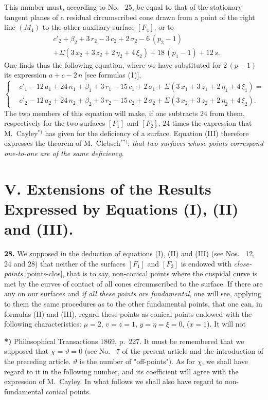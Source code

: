 \documentclass{article}
\begin{document}
This number must, according to No.~ 25, be equal to that of the stationary tangent planes of a residual circumscribed cone drawn from a point of the right line $(M_4)$ to the other auxiliary surface $[F_4]$, or to
\[
\begin{aligned}
& c'_2 + \beta_2 + 3\,r_2 - 3\,c_2 + 2\,\sigma_2 - 6\,(p_2 - 1) \\
& + \Sigma(3\,x_2 + 3\,z_2 + 2\,\eta_2 + 4\,\xi_2) + 18\,(p_1 - 1) + 12\,s.
\end{aligned}
\]
One finds thus the following equation, where we have substituted for $2\,(p - 1)$ its expression $a + c - 2\,n$ [see formulas (1)],
\[
\tag{III}
\left\{
\begin{aligned}
& c'_1 - 12\,a_1 + 24\,n_1 + \beta_1 + 3\,r_1 - 15\,c_1 + 2\,\sigma_1 + \Sigma(3\,x_1 + 3\,z_1 + 2\,\eta_1 + 4\,\xi_1) = \\
& c'_2 - 12\,a_2 + 24\,n_2 + \beta_2 + 3\,r_2 - 15\,c_2 + 2\,\sigma_2 + \Sigma(3\,x_2 + 3\,z_2 + 2\,\eta_2 + 4\,\xi_2).
\end{aligned}
\right.
\]
The two members of this equation will make, if one subtracts $24$ from them, respectively for the two surfaces $[F_1]$ and $[F_2]$, $24$ times the expression that M.~Cayley${}^{*)}$ has given for the deficiency of a surface. Equation (III) therefore expresses the theorem of M.~Clebsch${}^{**)}$: \emph{that two surfaces whose points correspond one-to-one are of the same deficiency}.

\section*{V. Extensions of the Results Expressed by Equations (I), (II) and (III).}

\textbf{28.} We supposed in the deduction of equations (I), (II) and (III) (see Nos.~ 12, 24 and 28) that neither of the surfaces $[F_1]$ and $[F_2]$ is endowed with \emph{close-points} [points-clos], that is to say, non-conical points where the cuspidal curve is met by the curves of contact of all cones circumscribed to the surface. If there are any on our surfaces and \emph{if all these points are fundamental}, one will see, applying to them the same procedures as to the other fundamental points, that one can, in formulas (II) and (III), regard these points as conical points endowed with the following characteristics: $\mu = 2$, $v = z = 1$, $y = \eta = \xi = 0$, ($x = 1$). It will not

\textbf{*)} Philosophical Transactions 1869, p.~227. It must be remembered that we supposed that $\chi = \vartheta = 0$ (see No.~ 7 of the present article and the introduction of the preceding article. $\vartheta$ is the number of "off-points"). As for $\chi$, we shall have regard to it in the following number, and its coefficient will agree with the expression of M.~Cayley. In what follows we shall also have regard to non-fundamental conical points.
\end{document}
